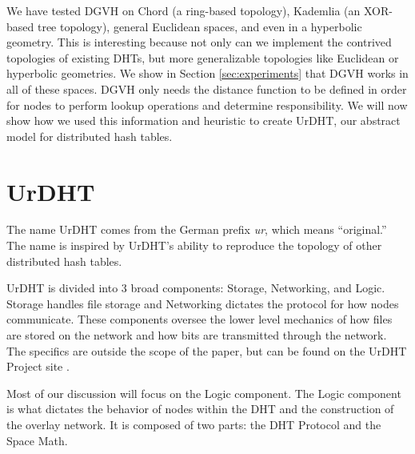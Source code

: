 \documentclass[11pt,conference]{IEEEtran}
\begin{document}
We have tested DGVH on Chord (a ring-based topology), Kademlia (an XOR-based tree topology), general Euclidean spaces, and even in a hyperbolic geometry.
This is interesting because not only can we implement the contrived topologies of existing DHTs, but more generalizable topologies like Euclidean or hyperbolic geometries.
We show in Section \ref{sec:experiments} that DGVH works in all of these spaces.
DGVH only needs the distance function to be defined in order for nodes to perform lookup operations and determine responsibility.
%	
We will now show how we used this information and heuristic to create UrDHT, our abstract model for distributed hash tables.





\section{UrDHT}
\label{sec:urdht}


The name UrDHT comes from the German prefix \textit{ur}, which means ``original.'' 
The name is inspired by UrDHT's ability to reproduce the topology of other distributed hash tables.

UrDHT is divided into 3 broad components: Storage, Networking, and Logic.
Storage handles file storage and Networking dictates the protocol for how nodes communicate.
These components oversee the lower level mechanics of how files are stored on the network and how bits are transmitted through the network.
The specifics are outside the scope of the paper, but can be found on the UrDHT Project site \cite{urdht}.

Most of our discussion will focus on the Logic component.
The Logic component is what dictates the behavior of nodes within the DHT and the construction of the overlay network.
It is composed of two parts: the DHT Protocol and the Space Math.
\end{document}
